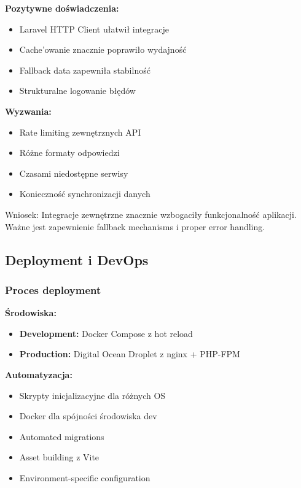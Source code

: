 \documentclass[12pt,a4paper]{article}
\begin{document}
    \textbf{Pozytywne doświadczenia:}
    \begin{itemize}
        \item Laravel HTTP Client ułatwił integracje
        \item Cache'owanie znacznie poprawiło wydajność
        \item Fallback data zapewniła stabilność
        \item Strukturalne logowanie błędów
    \end{itemize}

    \textbf{Wyzwania:}
    \begin{itemize}
        \item Rate limiting zewnętrznych API
        \item Różne formaty odpowiedzi
        \item Czasami niedostępne serwisy
        \item Konieczność synchronizacji danych
    \end{itemize}

    Wniosek: Integracje zewnętrzne znacznie wzbogaciły funkcjonalność aplikacji. Ważne jest zapewnienie fallback mechanisms i proper error handling.

    \subsection{Deployment i DevOps}

    \subsubsection{Proces deployment}

    \textbf{Środowiska:}
    \begin{itemize}
        \item \textbf{Development:} Docker Compose z hot reload
        \item \textbf{Production:} Digital Ocean Droplet z nginx + PHP-FPM
    \end{itemize}

    \textbf{Automatyzacja:}
    \begin{itemize}
        \item Skrypty inicjalizacyjne dla różnych OS
        \item Docker dla spójności środowiska dev
        \item Automated migrations
        \item Asset building z Vite
        \item Environment-specific configuration
    \end{itemize}
\end{document}
